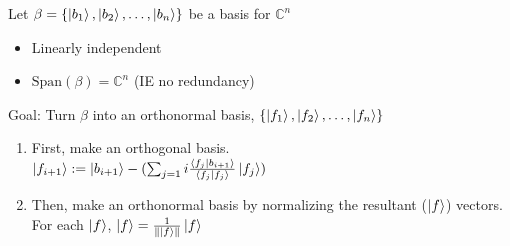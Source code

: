 \documentclass[12pt]{article}
\theoremstyle{plain}
\theoremstyle{nonumberplain}
\theoremstyle{plain}
\theoremstyle{nonumberplain}
\newcommand\1{{\bf 1}}
\newcommand{\C}{\mathbb{C}} %
\newcommand{\<}{\left\langle}
\renewcommand{\>}{\right\rangle}
\newcommand{\lp}{\left(}
\newcommand{\rp}{\right)}
\newcommand{\lb}{\left\{}
\newcommand{\rb}{\right\}}
\newcommand{\norm}[1]{\left\lVert#1\right\rVert} %
\newcommand{\inp}[2]{\left\langle#1\mid #2\right\rangle} %
\newcommand{\spn}[1]{\text{Span}\lp #1\rp} %
\newcommand{\setofkets}[1]{\lb \ket{#1_1}, \ket{#1_2}, \ldots, \ket{#1_n}\rb} %
\begin{document}
Let $\beta=\setofkets{b}$ be a basis for $\C^n$
\begin{itemize}
\item Linearly independent
\item $\spn{\beta}=\C^n$ (IE no redundancy)
\end{itemize}
Goal: Turn $\beta$ into an orthonormal basis, $\setofkets{f}$
\begin{enumerate}
\item First, make an orthogonal basis. \\
$\ket{f_{i+1}}:=\ket{b_{i+1}}-(\sum_{j=1}{i} \frac{\inp{f_j}{b_{i+1}}}{\inp{f_j}{f_j}}\ket{f_j})$
\item Then, make an orthonormal basis by normalizing the resultant ($\ket{f}$) vectors. \\
For each $\ket{f}$, $\ket{f}=\frac{1}{\norm{\ket{f}}}\ket{f}$
\end{enumerate}

\end{document}

